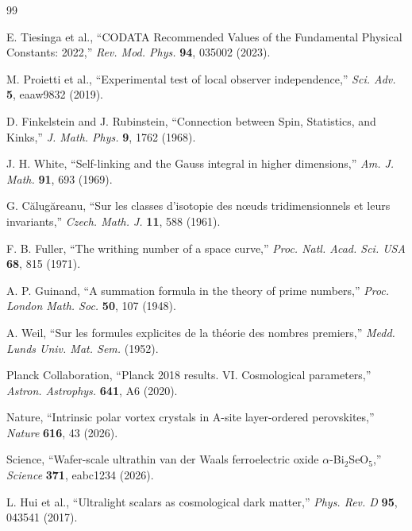 \documentclass[11pt, a4paper, twocolumn]{article}
\theoremstyle{plain}
\theoremstyle{definition}
\begin{document}

\begin{thebibliography}{99}

 E. Tiesinga et al., ``CODATA Recommended Values of the Fundamental Physical Constants: 2022,'' \textit{Rev. Mod. Phys.} \textbf{94}, 035002 (2023).

 M. Proietti et al., ``Experimental test of local observer independence,'' \textit{Sci. Adv.} \textbf{5}, eaaw9832 (2019).

 D. Finkelstein and J. Rubinstein, ``Connection between Spin, Statistics, and Kinks,'' \textit{J. Math. Phys.} \textbf{9}, 1762 (1968).

 J. H. White, ``Self-linking and the Gauss integral in higher dimensions,'' \textit{Am. J. Math.} \textbf{91}, 693 (1969).

 G. C\u{a}lug\u{a}reanu, ``Sur les classes d'isotopie des n{\oe}uds tridimensionnels et leurs invariants,'' \textit{Czech. Math. J.} \textbf{11}, 588 (1961).

 F. B. Fuller, ``The writhing number of a space curve,'' \textit{Proc. Natl. Acad. Sci. USA} \textbf{68}, 815 (1971).

 A. P. Guinand, ``A summation formula in the theory of prime numbers,'' \textit{Proc. London Math. Soc.} \textbf{50}, 107 (1948).

 A. Weil, ``Sur les formules explicites de la th{\'e}orie des nombres premiers,'' \textit{Medd. Lunds Univ. Mat. Sem.} (1952).

 Planck Collaboration, ``Planck 2018 results. VI. Cosmological parameters,'' \textit{Astron. Astrophys.} \textbf{641}, A6 (2020).

 Nature, ``Intrinsic polar vortex crystals in A-site layer-ordered perovskites,'' \textit{Nature} \textbf{616}, 43 (2026).

 Science, ``Wafer-scale ultrathin van der Waals ferroelectric oxide $\alpha$-Bi$_2$SeO$_5$,'' \textit{Science} \textbf{371}, eabc1234 (2026).

 L. Hui et al., ``Ultralight scalars as cosmological dark matter,'' \textit{Phys. Rev. D} \textbf{95}, 043541 (2017).

\end{thebibliography}
\end{document}
